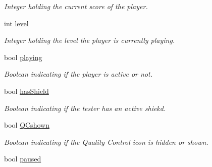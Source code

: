 \begin{DoxyCompactItemize}
\begin{DoxyCompactList}\small\item\em Integer holding the current score of the player. \end{DoxyCompactList}\item 
\hypertarget{classGame2Scene_a49519fa674cd9c8ca8a9457417e85fc4}{int \hyperlink{classGame2Scene_a49519fa674cd9c8ca8a9457417e85fc4}{level}}\label{classGame2Scene_a49519fa674cd9c8ca8a9457417e85fc4}

\begin{DoxyCompactList}\small\item\em Integer holding the level the player is currently playing. \end{DoxyCompactList}\item 
\hypertarget{classGame2Scene_a6ff9cd19f3f72aed39ed8be062a29d7d}{bool \hyperlink{classGame2Scene_a6ff9cd19f3f72aed39ed8be062a29d7d}{playing}}\label{classGame2Scene_a6ff9cd19f3f72aed39ed8be062a29d7d}

\begin{DoxyCompactList}\small\item\em Boolean indicating if the player is active or not. \end{DoxyCompactList}\item 
\hypertarget{classGame2Scene_a9c1a6b684aef62653967b041bcf54d34}{bool \hyperlink{classGame2Scene_a9c1a6b684aef62653967b041bcf54d34}{has\-Shield}}\label{classGame2Scene_a9c1a6b684aef62653967b041bcf54d34}

\begin{DoxyCompactList}\small\item\em Boolean indicating if the tester has an active shiekd. \end{DoxyCompactList}\item 
\hypertarget{classGame2Scene_a05c4ee0ba558f497fb651df5ef5ce8ba}{bool \hyperlink{classGame2Scene_a05c4ee0ba558f497fb651df5ef5ce8ba}{Q\-Cshown}}\label{classGame2Scene_a05c4ee0ba558f497fb651df5ef5ce8ba}

\begin{DoxyCompactList}\small\item\em Boolean indicating if the Quality Control icon is hidden or shown. \end{DoxyCompactList}\item 
\hypertarget{classGame2Scene_a124c98a6c77d9fc892dda3b87bf9476f}{bool \hyperlink{classGame2Scene_a124c98a6c77d9fc892dda3b87bf9476f}{paused}}\label{classGame2Scene_a124c98a6c77d9fc892dda3b87bf9476f}


\end{DoxyCompactItemize}
